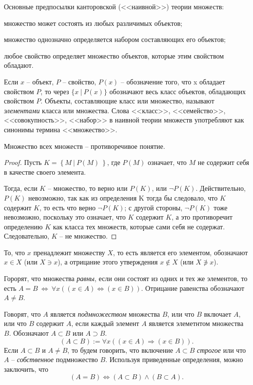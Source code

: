 Основные предпосылки канторовской (<<наивной>>) теории множеств:
\begin{oenum}
    \item множество может состоять из любых различимых объектов;
    \item множество однозначно определяется набором составляющих его объектов;
    \item любое свойство определяет множество объектов, которые этим свойством обладают.
\end{oenum}

Если $x$ -- объект, $P$ -- свойство, $P(x)$ -- обозначение того, что x обладает свойством $P$, то через $\{ x\ \vert\ P(x) \}$ обозначают весь класс объектов, обладающих свойством $P$.
Объекты, составляющие класс или множество, называют \textit{элементами} класса или множества. Слова <<класс>>, <<семейство>>, <<совокупность>>, <<набор>> в наивной теории
множеств употребляют как синонимы термина <<множество>>.

\begin{remark}
Множество всех множеств -- противоречивое понятие.
\end{remark}
\begin{proof}
Пусть $K = \left\{M  \  \vert \ P(M) \ \right\}$, где $P(M)$ означает, что $M$ не содержит себя в качестве своего элемента.

Тогда, если $K$ -- множество, то верно или $P(K)$, или $\neg P(K)$.
Действительно, $P(K)$ невозможно, так как из определения K тогда бы следовало, что $K$ содержит $K$, то есть что верно $\neg P(K)$; с другой стороны, $\neg P(K)$ тоже невозможно, поскольку это означает,
что $K$ содержит $K$, а это противоречит определению $K$ как класса тех множеств, которые сами себя не содержат.
Следовательно, $K$ -- не множество.
\end{proof}
То, что $x$ пренадлежит множеству $X$, то есть является его элементом, обозначают $x \in X$ (или $X \ni x$), а отрицание этого утверждения $x \notin X$ (или $X \not \ni x$).

Горорят, что множества \textit{равны}, если они состоят из одних и тех же элементов, то есть $A = B \ \Leftrightarrow \ \forall x ((x \in A) \Leftrightarrow (x \in B))$.
Отрицание равенства обозначают $A \not = B$.

Говорят, что $A$ является \textit{подмножеством} множества $B$, или что $B$ включает $A$, или что $B$ содержит $A$, если каждый элемент $A$ является элеметнтом множества $B$. Обозначают $A \subset B$ или $A \supset B$.
$$(A \subset B) := \forall x ((x \in A) \Rightarrow (x \in B)).$$
Если $A \subset B$ и $A \not = B$, то будем говорить, что включение $A \subset B$ \textit{строгое} или что $A$ -- \textit{собственное} подмножество $B$. Используя приведенные определения, можно заключить, что
$$(A = B) \Leftrightarrow (A \subset B) \wedge (B \subset A).$$

